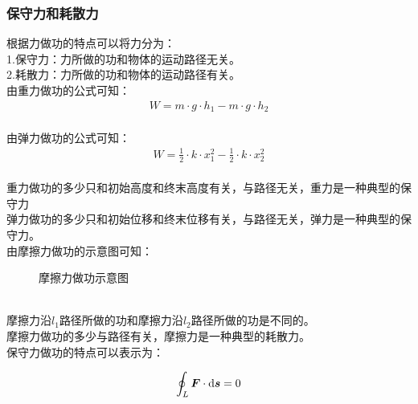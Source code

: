 \documentclass[UTF8]{ctexart}
\newcommand*{\veb}[1]{\vb*{#1}}
\newcommand*{\dif}{\mathop{}\!\mathrm{d}}
\begin{document}
\subsubsection{保守力和耗散力}
    \setcounter{equation}{0}
    根据力做功的特点可以将力分为：\\[3mm]
    1.保守力：力所做的功和物体的运动路径无关。\\[3mm]
    2.耗散力：力所做的功和物体的运动路径有关。\\[5mm]
    由重力做功的公式可知：
    \begin{align}
        W=m\cdot g\cdot h_1-m\cdot g\cdot h_2
    \end{align}\\
    由弹力做功的公式可知：
    \begin{align}
        W=\frac{1}{2}\cdot k\cdot x_1^2-\frac{1}{2}\cdot k\cdot x_2^2
    \end{align}\\
    重力做功的多少只和初始高度和终末高度有关，与路径无关，重力是一种典型的保守力\\[3mm]
    弹力做功的多少只和初始位移和终末位移有关，与路径无关，弹力是一种典型的保守力。\\[8mm]
    由摩擦力做功的示意图可知：\vspace{5pt}
    \begin{figure}[h]
        \begin{center}
            \caption{摩擦力做功示意图}
        \end{center}
    \end{figure}\\
    摩擦力沿$l_1$路径所做的功和摩擦力沿$l_2$路径所做的功是不同的。\\[3mm]
    摩擦力做功的多少与路径有关，摩擦力是一种典型的耗散力。\\[8mm]
    保守力做功的特点可以表示为：
    \begin{large}
        \begin{equation*}
            \oint_L\veb{F}\cdot\dif\veb{s}=0
        \end{equation*}
    \end{large}\\
\end{document}
